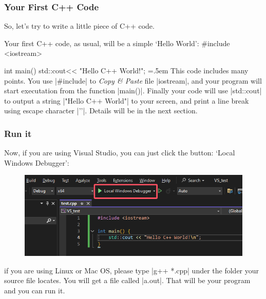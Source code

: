 \documentclass[compress,xcolor={dvipsnames}]{beamer}
\newenvironment{lcverbatim}
 {\SaveVerbatim{cverb}}
 {\endSaveVerbatim
  \flushleft\fboxrule=0pt\fboxsep=.5em
  \colorbox{cverbbg}{%
    \makebox[\dimexpr\linewidth-2\fboxsep][l]{\BUseVerbatim{cverb}}%
  }
  \endflushleft
}
\begin{document}
\begin{frame}[fragile]
    \frametitle{Your First C++ Code}

    So, let's try to write a little piece of C++ code.

    Your first C++ code, as usual, will be a simple `Hello World':
    \begin{lcverbatim}
        #include <iostream>

        int main(){
                std::cout<< "Hello C++ World!\n";
        }
    \end{lcverbatim}
    This code includes many points. You use \cverb|#include| to \emph{Copy \& Paste} file \cverb|iostream|, and your program will start executation from the function \cverb|main()|. Finally your code will use \cverb|std::cout| to output a string \cverb|"Hello C++ World"| to your screen, and print a line break using escape character \cverb|'\n'|. Details will be in the next section.

\end{frame}

\begin{frame}[fragile]
    \frametitle{Run it}

    Now, if you are using Visual Studio, you can just click the button: `Local Windows Debugger':
    \begin{figure}[!h]
        \centering
        \includegraphics[width=0.50\linewidth]{pic/VS_Build.png}
    \end{figure}
    if you are using Linux or Mac OS, please type \cverb|g++ *.cpp| under the folder your source file locates. You will get a file called \cverb|a.out|. That will be your program and you can run it. 
\end{frame}
\end{document}
